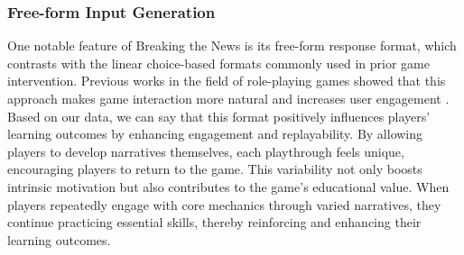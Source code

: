 




\subsubsection{Free-form Input Generation}
One notable feature of Breaking the News is its free-form response format, which contrasts with the linear choice-based formats commonly used in prior game intervention\cite{roozenbeek2019fake,camCambridgeGame,harmonysquare,jeon2021chamberbreaker,micallef2021fakey}. 
Previous works in the field of role-playing games showed that this approach makes game interaction more natural and increases user engagement \cite{csepregi2021effect,ashby2023personalized}.
Based on our data, we can say that this format positively influences players’ learning outcomes by enhancing engagement and replayability. 
By allowing players to develop narratives themselves, each playthrough feels unique, encouraging players to return to the game. This variability not only boosts intrinsic motivation but also contributes to the game's educational value. When players repeatedly engage with core mechanics through varied narratives, they continue practicing essential skills, thereby reinforcing and enhancing their learning outcomes\cite{kucklich2004play}. 

